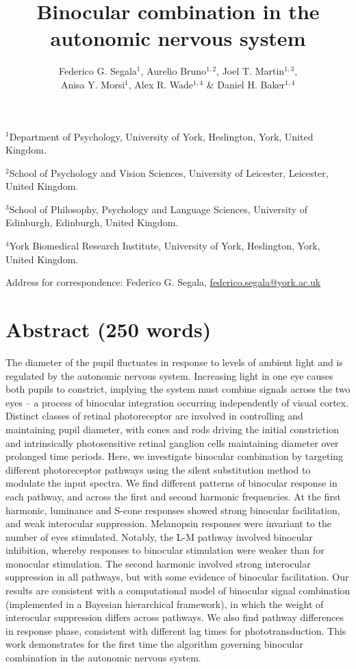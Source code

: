 \documentclass[
]{article}
\title{Binocular combination in the autonomic nervous system}
\author{Federico G. Segala\(^1\), Aurelio Bruno\(^{1,2}\), Joel T. Martin\(^{1,3}\),\\
Anisa Y. Morsi\(^1\), Alex R. Wade\(^{1,4}\) \& Daniel H. Baker\(^{1,4}\)}
\date{}
\begin{document}
\maketitle

\(^1\)Department of Psychology, University of York, Heslington, York, United Kingdom.

\(^2\)School of Psychology and Vision Sciences, University of Leicester, Leicester, United Kingdom.

\(^3\)School of Philosophy, Psychology and Language Sciences, University of Edinburgh, Edinburgh, United Kingdom.

\(^4\)York Biomedical Research Institute, University of York, Heslington, York, United Kingdom.

Address for correspondence: Federico G. Segala, \url{federico.segala@york.ac.uk}

\hypertarget{abstract-250-words}{%
\section{Abstract (250 words)}\label{abstract-250-words}}

The diameter of the pupil fluctuates in response to levels of ambient light and is regulated by the autonomic nervous system. Increasing light in one eye causes both pupils to constrict, implying the system must combine signals across the two eyes -- a process of binocular integration occurring independently of visual cortex. Distinct classes of retinal photoreceptor are involved in controlling and maintaining pupil diameter, with cones and rods driving the initial constriction and intrinsically photosensitive retinal ganglion cells maintaining diameter over prolonged time periods. Here, we investigate binocular combination by targeting different photoreceptor pathways using the silent substitution method to modulate the input spectra. We find different patterns of binocular response in each pathway, and across the first and second harmonic frequencies. At the first harmonic, luminance and S-cone responses showed strong binocular facilitation, and weak interocular suppression. Melanopsin responses were invariant to the number of eyes stimulated. Notably, the L-M pathway involved binocular inhibition, whereby responses to binocular stimulation were weaker than for monocular stimulation. The second harmonic involved strong interocular suppression in all pathways, but with some evidence of binocular facilitation. Our results are consistent with a computational model of binocular signal combination (implemented in a Bayesian hierarchical framework), in which the weight of interocular suppression differs across pathways. We also find pathway differences in response phase, consistent with different lag times for phototransduction. This work demonstrates for the first time the algorithm governing binocular combination in the autonomic nervous system.
\end{document}
